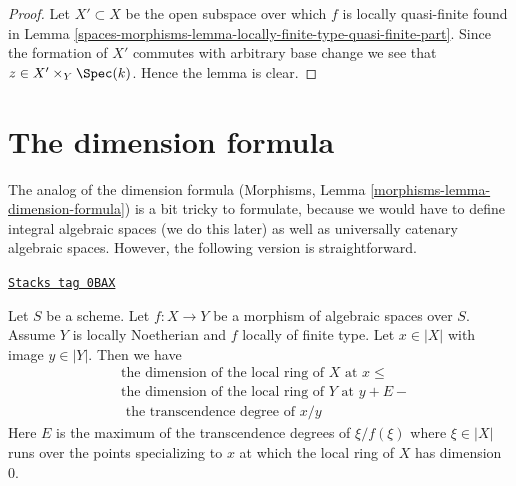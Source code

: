 \begin{proof}
Let $X' \subset X$ be the open subspace over which $f$ is locally quasi-finite
found in
Lemma \ref{spaces-morphisms-lemma-locally-finite-type-quasi-finite-part}.
Since the formation of $X'$ commutes with arbitrary base change we see
that $z \in X' \times_Y \Spec(k)$. Hence the lemma is clear.
\end{proof}

\section{The dimension formula}
\label{spaces-morphisms-section-dimension-formula}
The analog of the dimension formula
(Morphisms, Lemma \ref{morphisms-lemma-dimension-formula})
is a bit tricky to formulate, because we would have to define
integral algebraic spaces (we do this later) as well as
universally catenary algebraic spaces. However, the
following version is straightforward.

\begin{lemma}
\label{spaces-morphisms-lemma-dimension-formula-general}
\href{https://stacks.math.columbia.edu/tag/0BAX}{\texttt{Stacks tag 0BAX}}

Let $S$ be a scheme. Let $f : X \to Y$ be a morphism of algebraic
spaces over $S$. Assume $Y$ is locally Noetherian and $f$ locally
of finite type. Let $x \in |X|$ with image $y \in |Y|$.
Then we have
\begin{align*}
& \text{the dimension of the local ring of }X\text{ at }x \leq \\
& \text{the dimension of the local ring of }Y\text{ at }y + E - \\
& \text{ the transcendence degree of }x/y
\end{align*}
Here $E$ is the maximum of the transcendence degrees of $\xi/f(\xi)$
where $\xi \in |X|$ runs over the points specializing to $x$ at
which the local ring of $X$ has dimension $0$.
\end{lemma}


